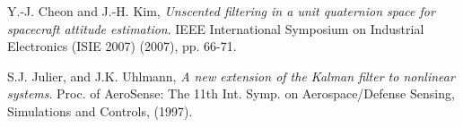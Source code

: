 \documentclass[twoside]{article}
\begin{document}
\begin{multicols}{2}
\begin{thebibliography}{2}
Y.-J. Cheon and J.-H. Kim, \emph{Unscented filtering in a unit quaternion space for spacecraft attitude estimation}. IEEE International Symposium on Industrial Electronics (ISIE 2007) (2007), pp. 66-71.

S.J. Julier, and J.K. Uhlmann, \emph{A new extension of the Kalman filter to nonlinear systems}. Proc. of AeroSense: The 11th Int. Symp. on Aerospace/Defense Sensing, Simulations and Controls, (1997).

\end{thebibliography}


\end{multicols}
\end{document}
